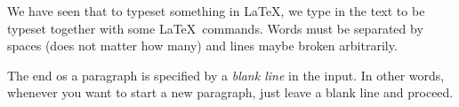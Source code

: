 \documentclass{article}
\begin{document}
\noindent We have seen that to typeset something in \LaTeX, we type in the text to be typeset together with some \LaTeX\ commands.
Words must be separated by spaces (does not matter how many) and lines maybe broken arbitrarily.

The end os a paragraph is specified by a \emph{blank line} in the input. In other words, whenever you want to start a new paragraph, just leave a blank line and proceed.
\end{document}
